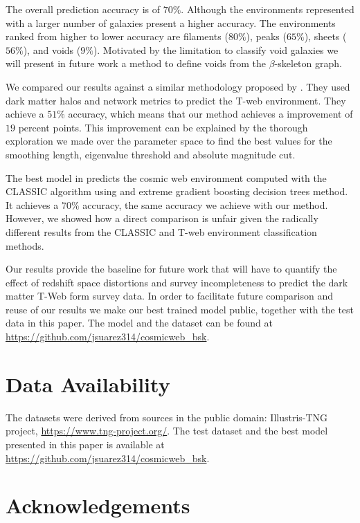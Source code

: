 \documentclass[usenatbib]{mnras}
\begin{document}
The overall prediction accuracy is of $70\%$.
Although the environments represented with a larger number of galaxies present a higher accuracy.
The environments ranked from higher to lower accuracy are filaments ($80\%$), peaks ($65\%$), sheets ($56\%$), and voids ($9\%$). 
Motivated by the limitation to classify void galaxies we will present in future work a method to define voids from the $\beta$-skeleton graph. 

We compared our results against a similar methodology proposed by \cite{Tsizh2019}.
They used dark matter halos and  network metrics to predict the T-web environment. 
They achieve a $51\%$ accuracy, which means that our method achieves a improvement of $19$ percent points.
This improvement can be explained by the thorough exploration we made over the parameter space to find the best values for
the smoothing length, eigenvalue threshold and absolute magnitude cut. 

The best model in \cite{Tsizh2019} predicts the cosmic web environment computed with the CLASSIC algorithm using and extreme gradient boosting decision trees method. 
It achieves a $70\%$ accuracy, the same accuracy we achieve with our method. 
However, we showed how a direct comparison is unfair given the radically different results from the CLASSIC and T-web environment classification methods.

Our results provide the baseline for future work that will have to quantify the effect of redshift space distortions and survey incompleteness to predict the dark matter T-Web form survey data.
In order to facilitate future comparison and reuse of our results we make our best trained model public, together with the test data in this paper.
The model and the dataset can be found at \url{https://github.com/jsuarez314/cosmicweb_bsk}. 

\section*{Data Availability}

The datasets were derived from sources in the public domain: Illustris-TNG project, \url{https://www.tng-project.org/}.
The test dataset and the best model presented in this paper is available at \url{https://github.com/jsuarez314/cosmicweb_bsk}.

\section*{Acknowledgements}
\end{document}
